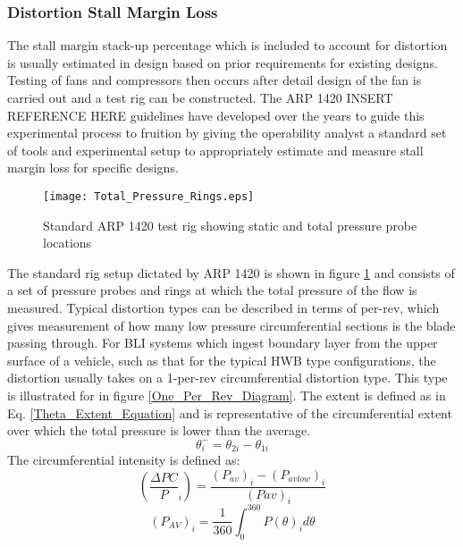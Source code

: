 			\subsubsection{\textbf{Distortion Stall Margin Loss}}
				The stall margin stack-up percentage which is included to account for distortion is usually estimated in design based on prior requirements for existing designs.  Testing of fans and compressors then occurs after detail design of the fan is carried out and a test rig can be constructed.  The ARP 1420 INSERT REFERENCE HERE guidelines have developed over the years to guide this experimental process to fruition by giving the operability analyst a standard set of tools and experimental setup to appropriately estimate and measure stall margin loss for specific designs. 
				\begin{figure}[htp]
					\centering
					\texttt{[image: Total\_Pressure\_Rings.eps]}
					\caption{Standard ARP 1420 test rig showing static and total pressure probe locations}
					\label{Total_Pressure_Rings}
				\end{figure}
				 The standard rig setup dictated by ARP 1420 is shown in figure \ref{Total_Pressure_Rings} and consists of a set of pressure probes and rings at which the total pressure of the flow is measured.  Typical distortion types can be described in terms of per-rev, which gives measurement of how many low pressure circumferential sections is the blade passing through.  For BLI systems which ingest boundary layer from the upper surface of a vehicle, such as that for the typical HWB type configurations, the distortion usually takes on a 1-per-rev circumferential distortion type.  This type is illustrated for in figure \ref{One_Per_Rev_Diagram}.  The extent is defined as in Eq. \ref{Theta_Extent_Equation} and is representative of the circumferential extent over which the total pressure is lower than the average.  
				\begin{equation}
					\theta^{-}_i = \theta_{2i} - \theta_{1i}
					\label{Theta_Extent_Equation}
				\end{equation}
				The circumferential intensity is defined as:		
				\begin{equation}
					(\frac{\Delta PC}{P}_i) = \frac{(P_{av})_i - (P_{avlow})_i}{(Pav)_i}
					\label{Circumferential_Intensity_Equation}
				\end{equation}				
				\begin{equation}
					(P_{AV})_i = \frac{1}
					{360} \int_0^{360}{P(\theta)_i d\theta}
					\label{Paverage}
				\end{equation}%
